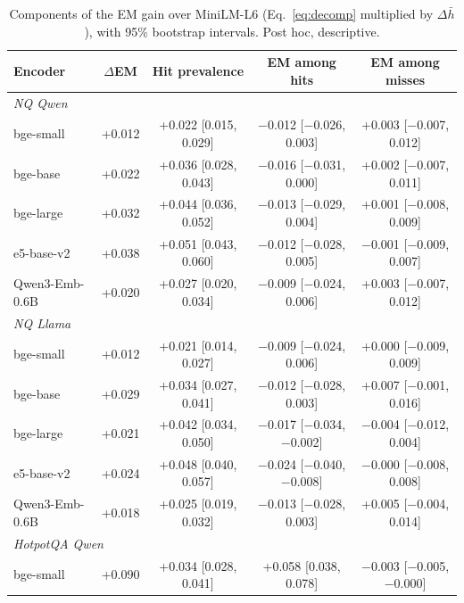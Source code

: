 \begin{table}[t]
\centering
\footnotesize
\caption{Components of the EM gain over MiniLM-L6 (Eq.~\ref{eq:decomp} multiplied by $\Delta\bar h$), with 95\% bootstrap intervals. Post hoc, descriptive.}
\label{tab:components}
\begin{tabular}{lcccc}
\toprule
Encoder & $\Delta$EM & Hit prevalence & EM among hits & EM among misses \\
\midrule
\multicolumn{5}{l}{\emph{NQ Qwen}} \\
bge-small & +0.012 & +0.022 [0.015, 0.029] & \ensuremath{-}0.012 [\ensuremath{-}0.026, 0.003] & +0.003 [\ensuremath{-}0.007, 0.012] \\
bge-base & +0.022 & +0.036 [0.028, 0.043] & \ensuremath{-}0.016 [\ensuremath{-}0.031, 0.000] & +0.002 [\ensuremath{-}0.007, 0.011] \\
bge-large & +0.032 & +0.044 [0.036, 0.052] & \ensuremath{-}0.013 [\ensuremath{-}0.029, 0.004] & +0.001 [\ensuremath{-}0.008, 0.009] \\
e5-base-v2 & +0.038 & +0.051 [0.043, 0.060] & \ensuremath{-}0.012 [\ensuremath{-}0.028, 0.005] & \ensuremath{-}0.001 [\ensuremath{-}0.009, 0.007] \\
Qwen3-Emb-0.6B & +0.020 & +0.027 [0.020, 0.034] & \ensuremath{-}0.009 [\ensuremath{-}0.024, 0.006] & +0.003 [\ensuremath{-}0.007, 0.012] \\
\multicolumn{5}{l}{\emph{NQ Llama}} \\
bge-small & +0.012 & +0.021 [0.014, 0.027] & \ensuremath{-}0.009 [\ensuremath{-}0.024, 0.006] & +0.000 [\ensuremath{-}0.009, 0.009] \\
bge-base & +0.029 & +0.034 [0.027, 0.041] & \ensuremath{-}0.012 [\ensuremath{-}0.028, 0.003] & +0.007 [\ensuremath{-}0.001, 0.016] \\
bge-large & +0.021 & +0.042 [0.034, 0.050] & \ensuremath{-}0.017 [\ensuremath{-}0.034, \ensuremath{-}0.002] & \ensuremath{-}0.004 [\ensuremath{-}0.012, 0.004] \\
e5-base-v2 & +0.024 & +0.048 [0.040, 0.057] & \ensuremath{-}0.024 [\ensuremath{-}0.040, \ensuremath{-}0.008] & \ensuremath{-}0.000 [\ensuremath{-}0.008, 0.008] \\
Qwen3-Emb-0.6B & +0.018 & +0.025 [0.019, 0.032] & \ensuremath{-}0.013 [\ensuremath{-}0.028, 0.003] & +0.005 [\ensuremath{-}0.004, 0.014] \\
\multicolumn{5}{l}{\emph{HotpotQA Qwen}} \\
bge-small & +0.090 & +0.034 [0.028, 0.041] & +0.058 [0.038, 0.078] & \ensuremath{-}0.003 [\ensuremath{-}0.005, \ensuremath{-}0.000] \\

\end{tabular}
\end{table}
